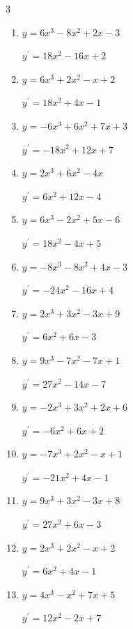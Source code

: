 \begin{multicols}{3}
\begin{enumerate}
  \item $y=6x^{3}-8x^{2}+2x-3$

        $\displaystyle y^{\prime}=18x^{2}-16x+2$

  \item $y=6x^{3}+2x^{2}-x+2$

        $\displaystyle y^{\prime}=18x^{2}+4x-1$

  \item $y=-6x^{3}+6x^{2}+7x+3$

        $\displaystyle y^{\prime}=-18x^{2}+12x+7$

  \item $y=2x^{3}+6x^{2}-4x$

        $\displaystyle y^{\prime}=6x^{2}+12x-4$

  \item $y=6x^{3}-2x^{2}+5x-6$

        $\displaystyle y^{\prime}=18x^{2}-4x+5$

  \item $y=-8x^{3}-8x^{2}+4x-3$

        $\displaystyle y^{\prime}=-24x^{2}-16x+4$

  \item $y=2x^{3}+3x^{2}-3x+9$

        $\displaystyle y^{\prime}=6x^{2}+6x-3$

  \item $y=9x^{3}-7x^{2}-7x+1$

        $\displaystyle y^{\prime}=27x^{2}-14x-7$

  \item $y=-2x^{3}+3x^{2}+2x+6$

        $\displaystyle y^{\prime}=-6x^{2}+6x+2$

  \item $y=-7x^{3}+2x^{2}-x+1$

        $\displaystyle y^{\prime}=-21x^{2}+4x-1$

  \item $y=9x^{3}+3x^{2}-3x+8$

        $\displaystyle y^{\prime}=27x^{2}+6x-3$

  \item $y=2x^{3}+2x^{2}-x+2$

        $\displaystyle y^{\prime}=6x^{2}+4x-1$

  \item $y=4x^{3}-x^{2}+7x+5$

        $\displaystyle y^{\prime}=12x^{2}-2x+7$


\end{enumerate}
\end{multicols}

